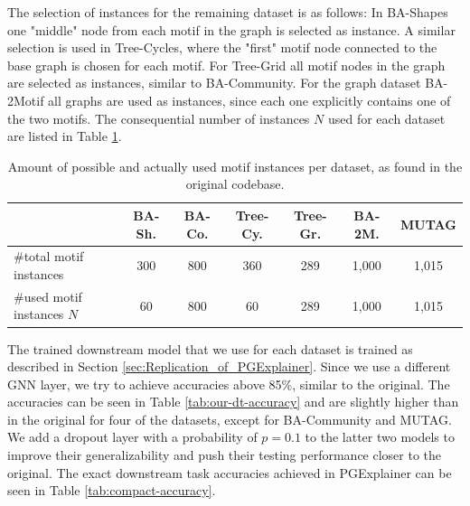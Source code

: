 The selection of instances for the remaining dataset is as follows: In BA-Shapes one "middle" node from each motif in the graph is selected as instance. A similar selection is used in Tree-Cycles, where the "first" motif node connected to the base graph is chosen for each motif. For Tree-Grid all motif nodes in the graph are selected as instances, similar to BA-Community. For the graph dataset BA-2Motif all graphs are used as instances, since each one explicitly contains one of the two motifs. The consequential number of instances $N$ used for each dataset are listed in Table \ref{tab:motif-statistics}.

\begin{table}[h]
    \centering
    \scriptsize
    \begin{tabular}{l|cccc|cc}
    \hline
    \textbf{} & \textbf{BA-Sh.} & \textbf{BA-Co.} & \textbf{Tree-Cy.} & \textbf{Tree-Gr.} & \textbf{BA-2M.} & \textbf{MUTAG} \\
    \hline
    \#total motif instances & 300 & 800 & 360 & 289 & 1,000 & 1,015 \\
    \#used motif instances $N$ & 60 & 800 & 60 & 289 & 1,000 & 1,015 \\
    \hline
    \end{tabular}
    \caption[Statistics of motif instances per dataset]{Amount of possible and actually used motif instances per dataset, as found in the original codebase.}
    \label{tab:motif-statistics}
\end{table}



The trained downstream model that we use for each dataset is trained as described in Section \ref{sec:Replication_of_PGExplainer}. Since we use a different GNN layer, we try to achieve accuracies above 85\%, similar to the original. The accuracies can be seen in Table \ref{tab:our-dt-accuracy} and are slightly higher than in the original for four of the datasets, except for BA-Community and MUTAG. We add a dropout layer with a probability of $p=0.1$ to the latter two models to improve their generalizability and push their testing performance closer to the original. The exact downstream task accuracies achieved in PGExplainer can be seen in Table \ref{tab:compact-accuracy}. \bigskip

